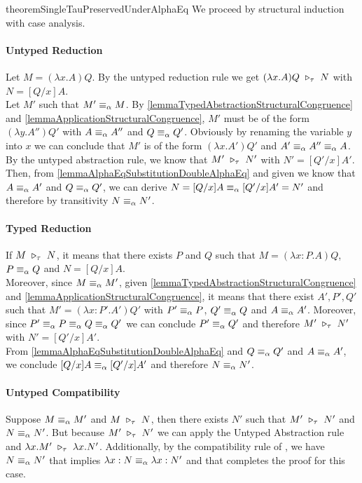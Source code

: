\begin{longproof}{theoremSingleTauPreservedUnderAlphaEq}
We proceed by structural induction with case analysis.

\paragraph{Untyped Reduction}
Let $M=(\lambda x.A)Q$. By the untyped reduction rule we get $(\lambda x.A)Q \ \triangleright_{\tau}\  N$ with $N=[Q/x]A$.\\
Let $M'$ such that $M' \equiv_\alpha M$. By \cref{lemmaTypedAbstractionStructuralCongruence} and \cref{lemmaApplicationStructuralCongruence}, $M'$ must be of the form $(\lambda y.A'')Q'$ with $A \equiv_\alpha A''$ and $Q \equiv_\alpha Q'$. Obviously by renaming the variable $y$ into $x$ we can conclude that $M'$ is of the form $(\lambda x.A')Q'$ and $A' \equiv_\alpha A'' \equiv_\alpha A$.
By the untyped abstraction rule, we know that $M' \ \triangleright_{\tau}\  N'$ with $N'=[Q'/x]A'$. Then, from \cref{lemmaAlphaEqSubstitutionDoubleAlphaEq} and given we know that $A \equiv_\alpha A'$ and $Q \equiv_\alpha Q'$, we can derive $N=[Q/x]A \equiv_\alpha [Q'/x]A'=N'$ and therefore by transitivity $N \equiv_\alpha N'$.

\paragraph{Typed Reduction}
If $M \ \triangleright_{\tau}\  N$, it means that there exists $P$ and $Q$ such that $M=(\lambda x:P.A)Q$, $P \equiv_\alpha Q$ and $N=[Q/x]A$.\\
Moreover, since $M \equiv_\alpha M'$, given \cref{lemmaTypedAbstractionStructuralCongruence} and \cref{lemmaApplicationStructuralCongruence}, it means that there exist $A',P',Q'$ such that $M'=(\lambda x:P'.A')Q'$ with $P' \equiv_\alpha P$, $Q' \equiv_\alpha Q$ and $A \equiv_\alpha A'$. Moreover, since $P' \equiv_\alpha P \equiv_\alpha Q \equiv_\alpha Q'$ we can conclude $P' \equiv_\alpha Q'$ and therefore $M' \ \triangleright_{\tau}\  N'$ with $N'=[Q'/x]A'$.\\
From \cref{lemmaAlphaEqSubstitutionDoubleAlphaEq} and $Q \equiv_\alpha Q'$ and $A \equiv_\alpha A'$, we conclude $[Q/x]A \equiv_\alpha [Q'/x]A'$ and therefore $N \equiv_\alpha N'$.

\paragraph{Untyped Compatibility}
Suppose $M \equiv_\alpha M'$ and $M \ \triangleright_{\tau}\  N$, then there exists $N'$ such that $M' \ \triangleright_{\tau}\  N'$ and $N \equiv_\alpha N'$. But because $M' \ \triangleright_{\tau}\  N'$ we can apply the Untyped Abstraction rule and $\lambda x.M' \ \triangleright_{\tau}\  \lambda x.N'$. Additionally, by the compatibility rule of \alphaequivalence, we have $N \equiv_\alpha N'$ that implies $\lambda x:N \equiv_\alpha \lambda x:N'$ and that completes the proof for this case.


\end{longproof}
